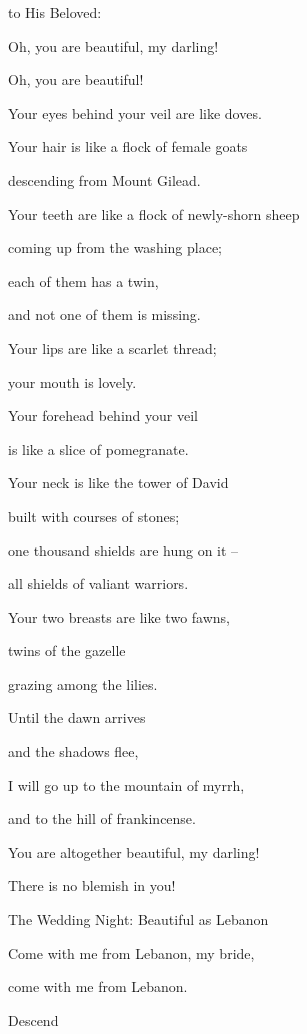 {{{to His Beloved:}}
\par }{\Q {}Oh, you are beautiful,
my darling!

\par }{\Q Oh,
you are beautiful!
\par }{\Q Your eyes
behind
your veil
are like doves.
\par }{\Q Your hair
is like a flock
of female goats
\par }{\Q descending
from Mount
Gilead.
\par }{\Q {}Your teeth
are like a flock
of newly-shorn
sheep
\par }{\Q coming up
from
the washing
place;

\par }{\Q each of them
has a twin,
\par }{\Q and not
one of them is missing.
\par }{\Q {}Your lips
are like a scarlet
thread;
\par }{\Q your mouth
is lovely.
\par }{\Q Your forehead
behind
your veil
\par }{\Q is like a slice
of pomegranate.
\par }{\Q {}Your neck
is like the tower
of David
\par }{\Q built
with courses of stones;
\par }{\Q one thousand
shields
are hung
on it –
\par }{\Q all shields of valiant warriors.
\par }{\Q {}Your two
breasts
are like two
fawns,
\par }{\Q twins
of the gazelle
\par }{\Q grazing
among the lilies.
\par }{\Q {}Until
the dawn arrives
\par }{\Q and the shadows
flee,
\par }{\Q I will go
up to
the mountain
of myrrh,
\par }{\Q and to
the hill
of frankincense.
\par }{\Q {}You are altogether
beautiful,
my darling!
\par }{\Q There is no
blemish in you!
\par }{\SH The Wedding Night: Beautiful as Lebanon
\par }{\Q {}Come
with
me from Lebanon,
my bride,
\par }{\Q come
with
me from Lebanon.
\par }{\Q Descend
}

